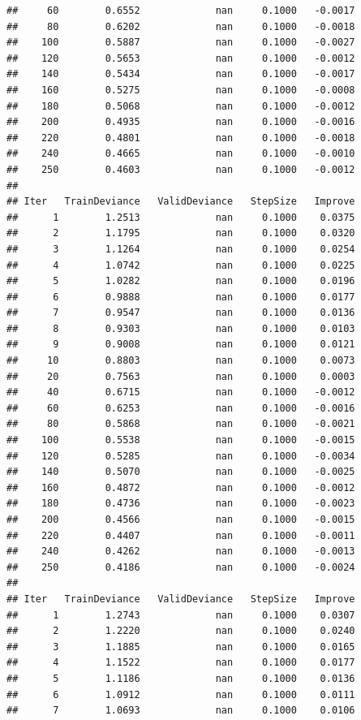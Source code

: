 \documentclass[
]{book}
\begin{document}
\begin{verbatim}
##     60        0.6552             nan     0.1000   -0.0017
##     80        0.6202             nan     0.1000   -0.0018
##    100        0.5887             nan     0.1000   -0.0027
##    120        0.5653             nan     0.1000   -0.0012
##    140        0.5434             nan     0.1000   -0.0017
##    160        0.5275             nan     0.1000   -0.0008
##    180        0.5068             nan     0.1000   -0.0012
##    200        0.4935             nan     0.1000   -0.0016
##    220        0.4801             nan     0.1000   -0.0018
##    240        0.4665             nan     0.1000   -0.0010
##    250        0.4603             nan     0.1000   -0.0012
## 
## Iter   TrainDeviance   ValidDeviance   StepSize   Improve
##      1        1.2513             nan     0.1000    0.0375
##      2        1.1795             nan     0.1000    0.0320
##      3        1.1264             nan     0.1000    0.0254
##      4        1.0742             nan     0.1000    0.0225
##      5        1.0282             nan     0.1000    0.0196
##      6        0.9888             nan     0.1000    0.0177
##      7        0.9547             nan     0.1000    0.0136
##      8        0.9303             nan     0.1000    0.0103
##      9        0.9008             nan     0.1000    0.0121
##     10        0.8803             nan     0.1000    0.0073
##     20        0.7563             nan     0.1000    0.0003
##     40        0.6715             nan     0.1000   -0.0012
##     60        0.6253             nan     0.1000   -0.0016
##     80        0.5868             nan     0.1000   -0.0021
##    100        0.5538             nan     0.1000   -0.0015
##    120        0.5285             nan     0.1000   -0.0034
##    140        0.5070             nan     0.1000   -0.0025
##    160        0.4872             nan     0.1000   -0.0012
##    180        0.4736             nan     0.1000   -0.0023
##    200        0.4566             nan     0.1000   -0.0015
##    220        0.4407             nan     0.1000   -0.0011
##    240        0.4262             nan     0.1000   -0.0013
##    250        0.4186             nan     0.1000   -0.0024
## 
## Iter   TrainDeviance   ValidDeviance   StepSize   Improve
##      1        1.2743             nan     0.1000    0.0307
##      2        1.2220             nan     0.1000    0.0240
##      3        1.1885             nan     0.1000    0.0165
##      4        1.1522             nan     0.1000    0.0177
##      5        1.1186             nan     0.1000    0.0136
##      6        1.0912             nan     0.1000    0.0111
##      7        1.0693             nan     0.1000    0.0106

\end{verbatim}
\end{document}
